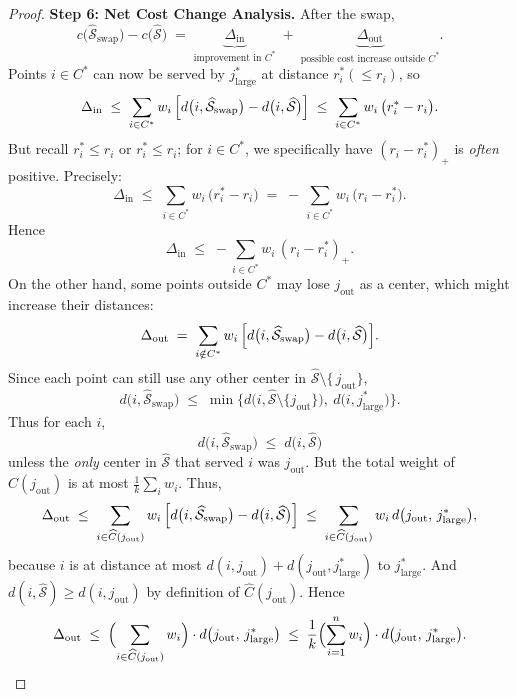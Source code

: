 \begin{proof}
\medskip
\noindent
\textbf{Step 6: Net Cost Change Analysis.}
After the swap, 
\[
   c\bigl(\widehat{\mathcal{S}}_{\mathrm{swap}}\bigr)
   -
   c\bigl(\widehat{\mathcal{S}}\bigr)
   \;=\;
   \underbrace{
     \Delta_{\mathrm{in}}
   }_{\text{improvement in }C^*}
   \;+\;
   \underbrace{
     \Delta_{\mathrm{out}}
   }_{\text{possible cost increase outside }C^*}.
\]
Points $i\in C^*$ can now be served by $j^*_{\text{large}}$ at distance $r_i^*(\le r_i)$, so 
\[
  \Delta_{\mathrm{in}}
  \;\le\;
  \sum_{i \in C^*} w_i\,
     \Bigl[
       d\bigl(i,\widehat{\mathcal{S}}_{\mathrm{swap}}\bigr)
       -
       d\bigl(i,\widehat{\mathcal{S}}\bigr)
     \Bigr]
  \;\le\;
  \sum_{i\in C^*} w_i
    \,\bigl(r_i^* - r_i\bigr).
\]
But recall $r_i^* \le r_i$ or $r_i^*\le r_i$; for $i\in C^*$, we specifically have $(r_i-r_i^*)_{+}$ is \emph{often} positive. Precisely:
\[
  \Delta_{\mathrm{in}}
  \;\le\;
  \sum_{i\in C^*} w_i\,\bigl(r_i^* - r_i\bigr)
  \;=\;
  -\,\sum_{i\in C^*} w_i\,\bigl(r_i - r_i^*\bigr).
\]
Hence
\[
  \Delta_{\mathrm{in}}
  \;\le\;
  -\sum_{i\in C^*} w_i\,(r_i - r_i^*)_{+}.
\]
On the other hand, some points outside $C^*$ may lose $j_{\mathrm{out}}$ as a center, which might increase their distances:
\[
  \Delta_{\mathrm{out}}
  \;=\;
  \sum_{i\notin C^*}
     w_i\,
     \Bigl[
       d\bigl(i,\widehat{\mathcal{S}}_{\mathrm{swap}}\bigr)
       -
       d\bigl(i,\widehat{\mathcal{S}}\bigr)
     \Bigr].
\]
Since each point can still use any other center in $\widehat{\mathcal{S}}\setminus\{\,j_{\mathrm{out}}\}$, 
\[
  d\!\bigl(i,\widehat{\mathcal{S}}_{\mathrm{swap}}\bigr)
  \;\le\;
  \min\!\bigl\{
    d\!\bigl(i,\widehat{\mathcal{S}}\setminus \{j_{\mathrm{out}}\}\bigr),\
    d\!\bigl(i,j^*_{\text{large}}\bigr)
  \bigr\}.
\]
Thus for each $i$, 
\[
  d\bigl(i,\widehat{\mathcal{S}}_{\mathrm{swap}}\bigr)
  \;\le\;
  d\bigl(i,\widehat{\mathcal{S}}\bigr)
\]
unless the \emph{only} center in $\widehat{\mathcal{S}}$ that served $i$ was $j_{\mathrm{out}}$. But the total weight of $\widehat{C}(j_{\mathrm{out}})$ is at most $\frac{1}{k}\sum_{i} w_i$.  Thus,
\[
  \Delta_{\mathrm{out}}
  \;\le\;
  \sum_{i\in \widehat{C}(j_{\mathrm{out}})} 
       w_i\,
       \Bigl[
         d\bigl(i,\widehat{\mathcal{S}}_{\mathrm{swap}}\bigr)
         -
         d\bigl(i,\widehat{\mathcal{S}}\bigr)
       \Bigr]
  \;\le\;
  \sum_{i\in \widehat{C}(j_{\mathrm{out}})} 
    w_i\,d\bigl(j_{\mathrm{out}},\,j^*_{\text{large}}\bigr),
\]
because $i$ is at distance at most $d(i,j_{\mathrm{out}})+d(j_{\mathrm{out}},j^*_{\text{large}})$ to $j^*_{\text{large}}$. And $d(i,\widehat{\mathcal{S}})\ge d(i,j_{\mathrm{out}})$ by definition of $\widehat{C}(j_{\mathrm{out}})$. Hence
\[
  \Delta_{\mathrm{out}}
  \;\le\;
  \Bigl(
    \sum_{i\in \widehat{C}(j_{\mathrm{out}})} w_i
  \Bigr)
  \cdot
  d\bigl(j_{\mathrm{out}},\,j^*_{\text{large}}\bigr)
  \;\le\;
  \frac{1}{k}
  \Bigl(\sum_{i=1}^n w_i\Bigr)
  \cdot
  d\bigl(j_{\mathrm{out}},\,j^*_{\text{large}}\bigr).
\]


\end{proof}
